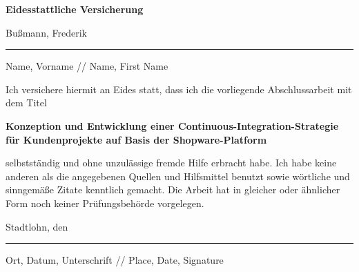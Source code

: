 
\thispagestyle{empty}
    \begingroup
        \fontsize{18pt}{20pt}\selectfont
        {\bfseries Eidesstattliche Versicherung}
    \endgroup

    \vskip 0.8cm

    \begingroup
        \fontsize{12pt}{18pt}\selectfont
        Bußmann, Frederik
    \endgroup

    \vskip -0.35cm

    \noindent\rule{14.4cm}{0.4pt}

    \vskip -0.2cm

    \begingroup
        \fontsize{8pt}{6pt}\selectfont
        Name, Vorname // Name, First Name
    \endgroup

    \vskip 0.6cm
    \begingroup
        \fontsize{10.5pt}{11.5pt}\selectfont
        Ich versichere hiermit an Eides statt, dass ich die vorliegende Abschlussarbeit mit dem Titel
    \endgroup

    \vskip 0.3cm

    \begingroup
        \fontsize{12pt}{18pt}\selectfont
        {\bfseries Konzeption und Entwicklung einer Continuous-Integration-Strategie für Kundenprojekte auf Basis der
        Shopware-Platform}
    \endgroup

    \vskip 0.3cm

    \begingroup
        \fontsize{10.5pt}{11.5pt}\selectfont
        selbstständig und ohne unzulässige fremde Hilfe erbracht habe.
        Ich habe keine anderen als die angegebenen Quellen und Hilfsmittel benutzt sowie wörtliche und sinngemäße
        Zitate kenntlich gemacht.
        Die Arbeit hat in gleicher oder ähnlicher Form noch keiner Prüfungsbehörde vorgelegen.
    \endgroup

    \vskip 0.8cm
    {\fontsize{12pt}{18pt}\selectfont
    Stadtlohn, den}

    \vskip -0.35cm

    \noindent\rule{14.4cm}{0.4pt}

    \vskip -0.2cm

    \begingroup
        \fontsize{8pt}{6pt}\selectfont
        Ort, Datum, Unterschrift // Place, Date, Signature
    \endgroup
\restoregeometry
\clearpage
